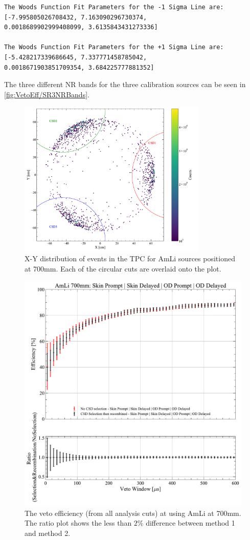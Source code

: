 \begin{enumerate}
\begin{lstlisting}[backgroundcolor = \color{lightgray}]
The Woods Function Fit Parameters for the -1 Sigma Line are:
[-7.995805026708432, 7.163090296730374,
0.0018689902999408099, 3.6135843431273336]

The Woods Function Fit Parameters for the +1 Sigma Line are:
[-5.428217339686645, 7.337771458785042,
0.0018671903851709354, 3.684225777881352]
\end{lstlisting}
The three different NR bands for the three calibration sources can be seen in \autoref{fig:VetoEff/SR3NRBands}.
\end{enumerate}

\begin{figure}
	\centering
	\includegraphics[width=0.8\textwidth]{figures/VetoEfficiency/CircularCSDCut.pdf}
	\caption{X-Y distribution of events in the TPC for AmLi sources positioned at 700mm. Each of the circular cuts are overlaid onto the plot.}
	\label{fig:VetoEff/CSDSelection}
\end{figure}
\begin{figure}
	\centering
	\includegraphics[width=0.8\linewidth]{figures/VetoEfficiency/AmLi_700mm_Total_CSDSelection.pdf}
	\caption{The veto efficiency (from all analysis cuts) at using AmLi at 700mm. The ratio plot shows the less than $2\%$ difference between method 1 and method 2.}
	\label{fig:VetoEff/CSDSelectionEffComp}
\end{figure}
